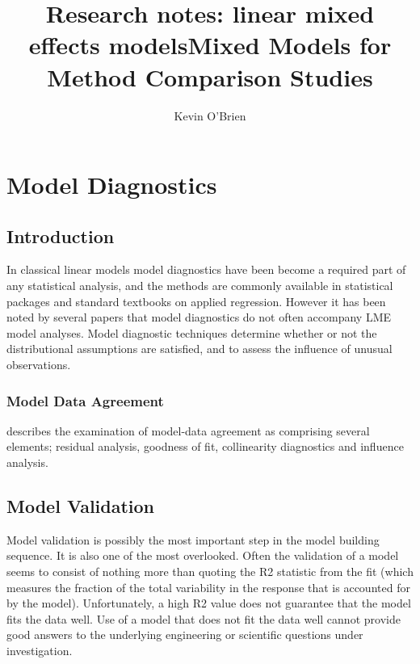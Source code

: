 \documentclass[12pt, a4paper]{report}
\title{Research notes: linear mixed effects models}
\author{ } \date{ }
\theoremstyle{plain}
\theoremstyle{definition}
\theoremstyle{remark}
\begin{document}
\author{Kevin O'Brien}
\title{Mixed Models for Method Comparison Studies}
\tableofcontents

\newpage

\chapter{Model Diagnostics}
\section{Introduction}%
In classical linear models model diagnostics have been become a required part of any statistical analysis, and the methods are commonly available in statistical packages and standard textbooks on applied regression. However it has been noted by several papers that model diagnostics do not often accompany LME model analyses.
Model diagnostic techniques determine whether or not the distributional assumptions are satisfied, and to assess the influence of unusual observations.

\subsection{Model Data Agreement} %
\citet{schabenberger} describes the examination of model-data agreement as comprising several elements; residual analysis, goodness of fit, collinearity diagnostics and influence analysis.

\section{Model Validation}
Model validation is possibly the most important step in the model building sequence. It is also one of the most overlooked. Often the validation of a model seems to consist of nothing more than quoting the R2 statistic from the fit (which measures the fraction of the total variability in the response that is accounted for by the model). Unfortunately, a high R2 value does not guarantee that the model fits the data well. Use of a model that does not fit the data well cannot provide good answers to the underlying engineering or scientific questions under investigation.
\end{document}
